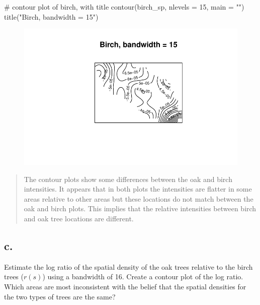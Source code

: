 \documentclass[
  letterpaper,
  DIV=11,
  numbers=noendperiod]{scrartcl}
\newenvironment{Shaded}{\begin{snugshade}}{\end{snugshade}}
\newcommand{\AttributeTok}[1]{\textcolor[rgb]{0.40,0.45,0.13}{#1}}
\newcommand{\CommentTok}[1]{\textcolor[rgb]{0.37,0.37,0.37}{#1}}
\newcommand{\DecValTok}[1]{\textcolor[rgb]{0.68,0.00,0.00}{#1}}
\newcommand{\FunctionTok}[1]{\textcolor[rgb]{0.28,0.35,0.67}{#1}}
\newcommand{\NormalTok}[1]{\textcolor[rgb]{0.00,0.23,0.31}{#1}}
\newcommand{\StringTok}[1]{\textcolor[rgb]{0.13,0.47,0.30}{#1}}
\begin{document}
\begin{Shaded}
\begin{Highlighting}[]
\CommentTok{\# contour plot of birch, with title}
\FunctionTok{contour}\NormalTok{(birch\_sp, }\AttributeTok{nlevels =} \DecValTok{15}\NormalTok{, }\AttributeTok{main =} \StringTok{""}\NormalTok{)}
\FunctionTok{title}\NormalTok{(}\StringTok{"Birch, bandwidth = 15"}\NormalTok{)}
\end{Highlighting}
\end{Shaded}

\begin{figure}[H]

{\centering \includegraphics{cc-r-kd-hw_files/figure-pdf/unnamed-chunk-2-2.pdf}

}

\end{figure}

\begin{quote}
The contour plots show some differences between the oak and birch
intensities. It appears that in both plots the intensities are flatter
in some areas relative to other areas but these locations do not match
between the oak and birch plots. This implies that the relative
intensities between birch and oak tree locations are different.
\end{quote}

\hypertarget{c.}{%
\subsection{c.}\label{c.}}

Estimate the log ratio of the spatial density of the oak trees relative
to the birch trees (\(r(s)\)) using a bandwidth of 16. Create a contour
plot of the log ratio. Which areas are most inconsistent with the belief
that the spatial densities for the two types of trees are the same?
\end{document}
